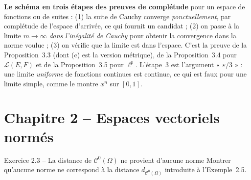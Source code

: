 \documentclass[11pt,a4paper]{article}
\newcommand{\Lc}{\mathcal{L}}
\newcommand{\Cz}{\mathcal{C}^0}
\theoremstyle{definition}
\begin{document}
\begin{pointcle}
\textbf{Le schéma en trois étapes des preuves de complétude} pour un espace de fonctions ou de suites : (1) la suite de Cauchy converge \emph{ponctuellement}, par complétude de l'espace d'arrivée, ce qui fournit un candidat ; (2) on passe à la limite $m\to\infty$ \emph{dans l'inégalité de Cauchy} pour obtenir la convergence dans la norme voulue ; (3) on vérifie que la limite est dans l'espace. C'est la preuve de la Proposition~3.3 (dont (c) est la version métrique), de la Proposition~3.4 pour $\Lc(E,F)$ et de la Proposition~3.5 pour $\ell^p$. L'étape~3 est l'argument « $\varepsilon/3$ » : une limite \emph{uniforme} de fonctions continues est continue, ce qui est faux pour une limite simple, comme le montre $x^n$ sur $[0,1]$.
\end{pointcle}

\section{Chapitre 2 -- Espaces vectoriels normés}

\begin{exo}{Exercice 2.3 -- La distance de $\Cz(\Omega)$ ne provient d'aucune norme}
Montrer qu'aucune norme ne correspond à la distance $d_{\Cz(\Omega)}$ introduite à l'Exemple~2.5.
\end{exo}
\end{document}
